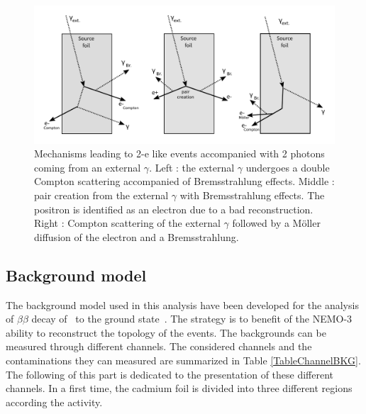 \documentclass[main.tex]{subfiles}
\begin{document}
\begin{figure}[h!]
\begin{center}
\includegraphics[scale=0.48]{pictures/Chap6/ExternalBkg.pdf}
\end{center}
\caption{Mechanisms leading to 2-e like events accompanied with 2 photons coming from an external $\gamma$. Left : the external $\gamma$ undergoes a double Compton scattering accompanied of Bremsstrahlung effects. Middle : pair creation from the external $\gamma$ with Bremsstrahlung effects. The positron is identified as an electron due to a bad reconstruction. Right : Compton scattering of the external $\gamma$ followed by a M\"oller diffusion of the electron and a Bremsstrahlung.}
\label{ExternalBkgPicture}
\end{figure}


\FloatBarrier


\subsection{Background model}\label{sec:BkgModel}


\NI The background model used in this analysis have been developed for the analysis of $\beta\beta$ decay of \Cd~to the ground state~\cite{Arnold2016bed}. The strategy is to benefit of the NEMO-3 ability to reconstruct the topology of the events. The backgrounds can be measured through different channels. The considered channels and the contaminations they can measured are summarized in Table \ref{TableChannelBKG}. The following of this part is dedicated to the presentation of these different channels. In a first time, the cadmium foil is divided into three different regions according the activity. 
\end{document}
